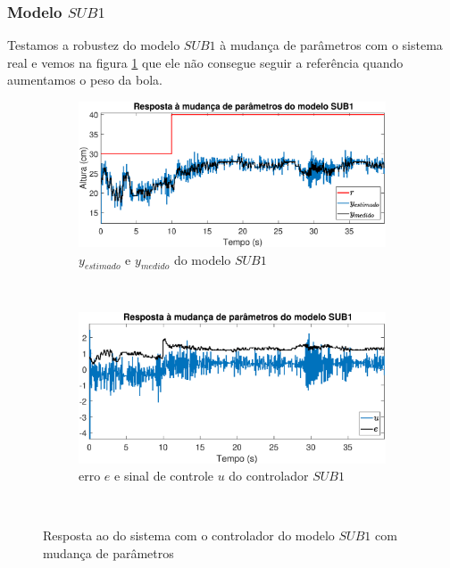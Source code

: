 \subsubsection{Modelo $SUB1$}
Testamos a robustez do modelo $SUB1$ à mudança de parâmetros com o sistema real e vemos na figura \ref{fig:mprsub1y} que ele não consegue seguir a referência quando aumentamos o peso da bola.
\begin{figure}[htb]
	\centering
	\begin{subfigure}[t]{0.48\textwidth}
		\includegraphics[width=1\linewidth]{mprsub1y}
		\caption[$y_{estimado}$ e $y_{medido}$ do modelo $SUB1$]{$y_{estimado}$ e $y_{medido}$ do modelo $SUB1$}
		\label{fig:mprsub1y}
	\end{subfigure}
	~ %
	\begin{subfigure}[t]{0.48\textwidth}
		\includegraphics[width=1\linewidth]{mprsub1e}
		\caption[erro $e$ e sinal de controle $u$ do controlador $SUB1$]{erro $e$ e sinal de controle $u$ do controlador $SUB1$}
		\label{fig:mprsub1e}
	\end{subfigure}
	~ %
	
	\caption{Resposta ao do sistema com o controlador do modelo $SUB1$ com mudança de parâmetros}\label{fig:mprsub1}
\end{figure}

